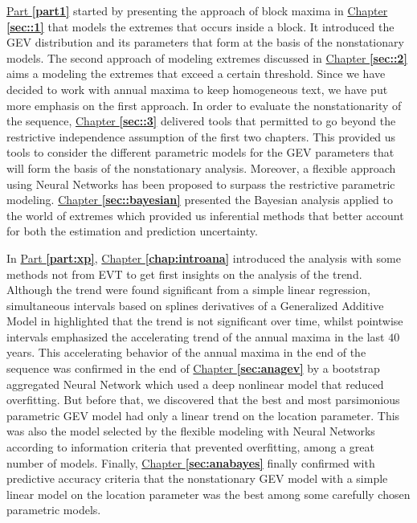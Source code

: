 \documentclass[11pt,a4paper,openany, twosided]{book}
\begin{document}
\hyperref[part1]{Part \textbf{\ref{part1}}} started by presenting the approach of block maxima in \hyperref[sec::1]{Chapter \textbf{\ref{sec::1}}} that models the extremes that occurs inside a block. It introduced the GEV distribution and its parameters that form at the basis of the nonstationary models.
The second approach of modeling extremes discussed in \hyperref[sec::2]{Chapter \textbf{\ref{sec::2}}} aims a modeling the extremes that exceed a certain threshold.
Since we have decided to work with annual maxima to keep homogeneous text, we have put more emphasis on the first approach. In order to evaluate the nonstationarity of the sequence,
\hyperref[sec::3]{Chapter \textbf{\ref{sec::3}}} delivered tools that permitted to go beyond the restrictive independence assumption of the first two chapters. This provided us tools to consider the different parametric models for the GEV parameters that will form the basis of the nonstationary analysis. Moreover, a flexible approach using Neural Networks has been proposed to surpass  the restrictive parametric modeling.
\hyperref[sec::bayesian]{Chapter \textbf{\ref{sec::bayesian}}} presented the Bayesian analysis applied to the world of extremes which provided us inferential methods that better account for both the estimation and prediction uncertainty. 

In \hyperref[part:xp]{Part \textbf{\ref{part:xp}}},  \hyperref[chap:introana]{Chapter \textbf{\ref{chap:introana}}} introduced the analysis with some methods not from EVT to get first insights on the analysis of the trend. Although the trend were found significant from a simple linear regression, simultaneous intervals based on splines derivatives of a Generalized Additive Model in highlighted that the trend is not significant over time, whilst pointwise intervals emphasized the accelerating trend of the annual maxima in the last $40$ years. This accelerating behavior of the annual maxima in the end of the sequence was confirmed in the end of \hyperref[sec:anagev]{Chapter \textbf{\ref{sec:anagev}}} by a bootstrap aggregated Neural Network which used a deep nonlinear model that reduced overfitting. But before that, we discovered that the best and most parsimonious parametric GEV model had only a linear trend on the location parameter. This was also the model selected by the flexible modeling with Neural Networks according to information criteria that prevented overfitting, among a great number of models. Finally, \hyperref[sec:anabayes]{Chapter \textbf{\ref{sec:anabayes}}} finally confirmed  with predictive accuracy criteria that the nonstationary GEV model with a simple linear model on the location parameter was the best among some carefully chosen parametric models.
\newline
\end{document}
